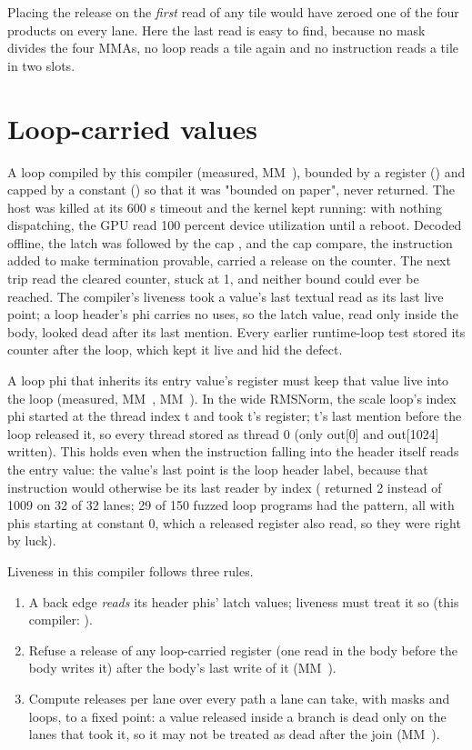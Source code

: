 Placing the release on the \emph{first} read of any tile would have zeroed one of the four products on every lane. Here
the last read is easy to find, because no mask divides the four MMAs, no loop reads a tile again and no instruction
reads a tile in two slots.

\section{Loop-carried values}\label{sec:loops-loop-variable-rule}

A loop compiled by this compiler (measured, MM~), bounded by a register
() and capped by a constant () so that it was "bounded on paper", never returned. The host was killed
at its 600 s timeout and the kernel kept running: with nothing dispatching, the GPU read 100 percent device utilization
until a reboot. Decoded offline, the latch was  followed by the cap
, and the cap compare, the instruction added to make termination provable, carried a release on the
counter. The next trip read the cleared counter,  stuck at 1, and neither bound could ever be reached.
The compiler's liveness took a value's last textual read as its last live point; a loop header's phi carries no uses, so
the latch value, read only inside the body, looked dead after its last mention. Every earlier runtime-loop test stored its
counter after the loop, which kept it live and hid the defect.

A loop phi that inherits its entry value's register must keep
that value live into the loop (measured, MM~, MM~). In the wide RMSNorm, the scale loop's index phi started at the thread index t and took
t's register; t's last mention before the loop released it, so every thread stored as thread 0 (only out{[}0{]} and out{[}1024{]}
written). This holds even when the instruction falling into the header itself reads the entry value: the value's last
point is the loop header label, because that instruction would otherwise be its last reader by index ( returned 2 instead of 1009 on 32 of 32 lanes; 29 of 150 fuzzed loop programs had the pattern, all with
phis starting at constant 0, which a released register also read, so they were right by luck).

Liveness in this compiler follows three rules.

\begin{enumerate}
\def\labelenumi{\arabic{enumi}.}
\item A back edge \emph{reads} its header phis' latch values; liveness must treat it so (this compiler: ).
\item Refuse a release of any loop-carried register (one read in the body before the body writes it) after the body's last
  write of it (MM~).
\item Compute releases per lane over every path a lane can take, with masks and loops, to a fixed point: a value released
  inside a branch is dead only on the lanes that took it, so it may not be treated as dead after the join (MM~).
\end{enumerate}

